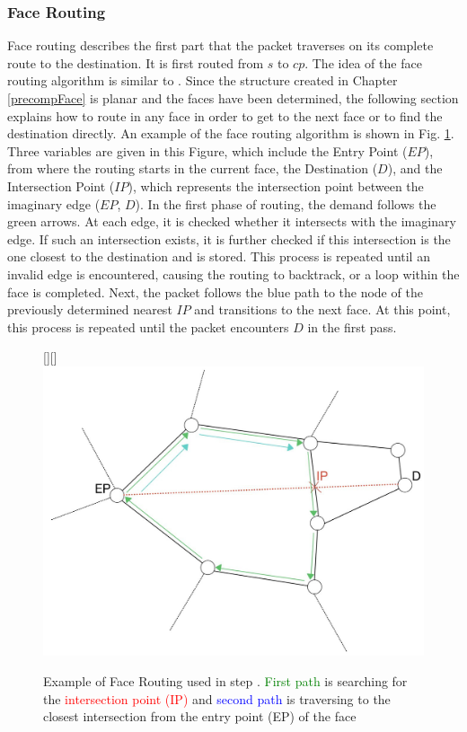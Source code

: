 \documentclass[conference]{IEEEtran}
\begin{document}
\subsubsection{Face Routing}
\label{routingFaces}
Face routing describes the first part that the packet traverses on its complete route to the destination. It is first routed from $s$ to $cp$. 
The idea of the face routing algorithm is similar to \cite{facerouting}.
Since the structure created in Chapter \ref{precompFace} is planar and the faces have been determined, the following section explains how to route in any face in order to get to the next face or to find the destination directly.
An example of the face routing  algorithm is shown in Fig. \ref{faceRoutingExample}. 
Three variables are given in this Figure, which include the Entry Point ($EP$), from where the routing starts in the current face, the Destination ($D$), and the Intersection Point ($IP$), which represents the intersection point between the imaginary edge ($EP$, $D$).
In the first phase of routing, the demand follows the green arrows. At each edge, it is checked whether it intersects with the imaginary edge. If such an intersection exists, it is further checked if this intersection is the one closest to the destination and is stored. This process is repeated until an invalid edge is encountered, causing the routing to backtrack, or a loop within the face is completed.
Next, the packet follows the blue path to the node of the previously determined nearest $IP$ and transitions to the next face. At this point, this process is repeated until the packet encounters $D$ in the first pass.


\begin{figure}[t]
    \centering
    \raisebox{0pt}[\height][\depth]{\hspace*{-1cm}\includegraphics[scale=0.19]{figures/faceroutingExample.jpg}}
    \caption{Example of Face Routing used in step . \textcolor{green}{First path} is searching for the \textcolor{red}{intersection point (IP)} and \textcolor{blue}{second path} is traversing to the closest intersection from the entry point (EP) of the face}

    \label{faceRoutingExample}
\end{figure}
\end{document}
